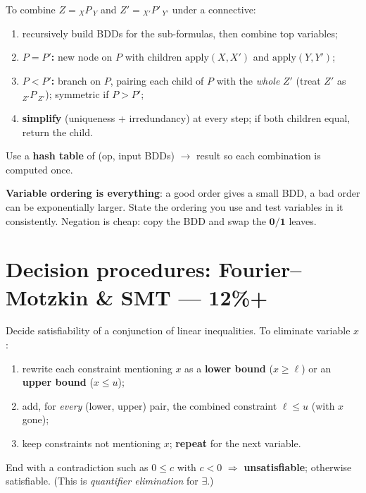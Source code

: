 \documentclass[11pt,a4paper]{article}
\begin{document}
\begin{must}[title=Building the BDD of a connective (the ``apply'' recursion)]
To combine $Z={}_X P\,_Y$ and $Z'={}_{X'}P'\,_{Y'}$ under a connective:
\begin{enumerate}[leftmargin=*,itemsep=0pt]
  \item recursively build BDDs for the sub-formulas, then combine top variables;
  \item \textbf{$P=P'$:} new node on $P$ with children $\mathrm{apply}(X,X')$ and $\mathrm{apply}(Y,Y')$;
  \item \textbf{$P<P'$:} branch on $P$, pairing each child of $P$ with the \emph{whole} $Z'$ (treat $Z'$ as $_{Z'}P\,_{Z'}$); symmetric if $P>P'$;
  \item \textbf{simplify} (uniqueness + irredundancy) at every step; if both children equal, return the child.
\end{enumerate}
Use a \textbf{hash table} of (op, input BDDs) $\to$ result so each combination is computed once.
\end{must}

\begin{gotcha}
\textbf{Variable ordering is everything}: a good order gives a small BDD, a bad order can be exponentially larger. State the ordering you use and test variables in it consistently. Negation is cheap: copy the BDD and swap the $\mathbf 0/\mathbf 1$ leaves.
\end{gotcha}

\section{Decision procedures: Fourier--Motzkin \& SMT --- 12\%+}

\begin{must}[title=Fourier--Motzkin variable elimination (linear arithmetic over $\mathbb{R}/\mathbb{Q}$)]
Decide satisfiability of a conjunction of linear inequalities. To eliminate variable $x$:
\begin{enumerate}[leftmargin=*,itemsep=0pt]
  \item rewrite each constraint mentioning $x$ as a \textbf{lower bound} ($x\ge\ell$) or an \textbf{upper bound} ($x\le u$);
  \item add, for \emph{every} (lower, upper) pair, the combined constraint $\ell\le u$ (with $x$ gone);
  \item keep constraints not mentioning $x$; \textbf{repeat} for the next variable.
\end{enumerate}
End with a contradiction such as $0\le c$ with $c<0$ $\Rightarrow$ \textbf{unsatisfiable}; otherwise satisfiable. (This is \emph{quantifier elimination} for $\exists$.)
\end{must}
\end{document}

